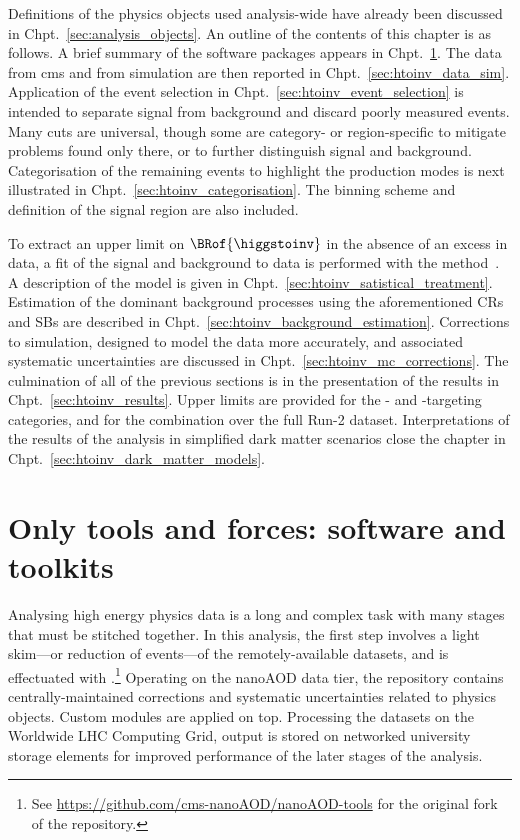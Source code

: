 Definitions of the physics objects used analysis-wide have already been discussed in Chpt.~\ref{sec:analysis_objects}. An outline of the contents of this chapter is as follows. A brief summary of the software packages appears in Chpt.~\ref{sec:htoinv_software}. The data from \acrshort{cms} and from simulation are then reported in Chpt.~\ref{sec:htoinv_data_sim}. Application of the event selection in Chpt.~\ref{sec:htoinv_event_selection} is intended to separate signal from background and discard poorly measured events. Many cuts are universal, though some are category- or region-specific to mitigate problems found only there, or to further distinguish signal and background. Categorisation of the remaining events to highlight the production modes is next illustrated in Chpt.~\ref{sec:htoinv_categorisation}. The binning scheme and definition of the signal region are also included.

To extract an upper limit on $\BRof{\higgstoinv}$ in the absence of an excess in data, a fit of the signal and background to data is performed with the \CLs method~\cite{Read_2002}. A description of the model is given in Chpt.~\ref{sec:htoinv_satistical_treatment}. Estimation of the dominant background processes using the aforementioned \glspl{CR} and \glspl{SB} are described in Chpt.~\ref{sec:htoinv_background_estimation}. Corrections to simulation, designed to model the data more accurately, and associated systematic uncertainties are discussed in Chpt.~\ref{sec:htoinv_mc_corrections}. The culmination of all of the previous sections is in the presentation of the results in Chpt.~\ref{sec:htoinv_results}. Upper limits are provided for the \ttH- and \VH-targeting categories, and for the combination over the full Run-2 dataset. Interpretations of the results of the analysis in simplified dark matter scenarios close the chapter in Chpt.~\ref{sec:htoinv_dark_matter_models}.




\section{Only tools and forces: software and toolkits}
\label{sec:htoinv_software}

Analysing high energy physics data is a long and complex task with many stages that must be stitched together. In this analysis, the first step involves a light skim---or reduction of events---of the remotely-available datasets, and is effectuated with \nanoAODtools.\footnote{See \url{https://github.com/cms-nanoAOD/nanoAOD-tools} for the original fork of the repository.} Operating on the nanoAOD data tier, the repository contains centrally-maintained corrections and systematic uncertainties related to physics objects. Custom modules are applied on top. Processing the datasets on the Worldwide LHC Computing Grid, output is stored on networked university storage elements for improved performance of the later stages of the analysis.

